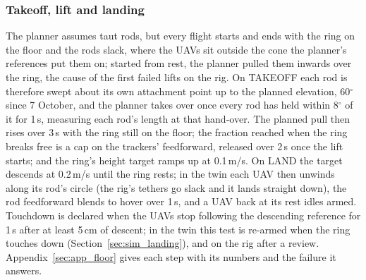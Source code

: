 
\subsubsection{Takeoff, lift and landing}
\label{sec:takeoff}

The planner assumes taut rods, but every flight starts and ends with the ring on the floor and the rods slack, where
the UAVs sit outside the cone the planner's references put them on; started from rest, the planner pulled them inwards
over the ring, the cause of the first failed lifts on the rig. On TAKEOFF each rod is therefore swept about its own
attachment point up to the planned elevation, 60$^\circ$ since 7 October, and the planner takes over once every rod
has held within 8$^\circ$ of it for 1\,s, measuring each rod's length at that hand-over. The planned pull then rises
over 3\,s with the ring still on the floor; the fraction reached when the ring breaks free is a cap on the trackers'
feedforward, released over 2\,s once the lift starts; and the ring's height target ramps up at 0.1\,m/s. On LAND the
target descends at 0.2\,m/s until the ring rests; in the twin each UAV then unwinds along its rod's circle (the rig's
tethers go slack and it lands straight down), the rod feedforward blends to hover over 1\,s, and a UAV back at its rest
idles armed. Touchdown is declared when the UAVs stop following the descending reference for 1\,s after at least
5\,cm of descent; in the twin this test is re-armed when the ring touches down (Section~\ref{sec:sim_landing}), and on
the rig after a review. Appendix~\ref{sec:app_floor} gives each step with its numbers and the failure it answers.
